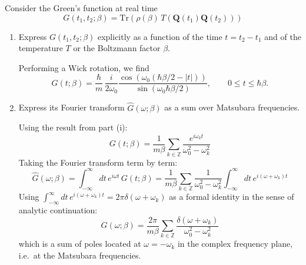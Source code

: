     
    Consider the Green's function at real time
    \begin{equation}
        G(t_1, t_2; \beta) = \mathrm{Tr}\!\left(\rho(\beta)\,T(\mathbf{Q}(t_1)\mathbf{Q}(t_2))\right)
    \end{equation}
    
    \begin{enumerate}[label=\alph*), resume]
    
        \item Express $G(t_1, t_2;\beta)$ explicitly as a function of the time $t = t_2 - t_1$ and of the temperature $T$ or the Boltzmann factor $\beta$.
        \begin{solution}
            Performing a Wick rotation, we find
            \begin{equation}
                G(t;\beta) = \frac{\hbar}{m}\,\frac{i}{2\omega_0}
            \frac{\cos\!\left(\omega_0(\hbar\beta/2 - |t|)\right)}{\sin\!\left(\omega_0\hbar\beta/2\right)},
            \qquad 0 \leq t \leq \hbar\beta.
            \end{equation}
        \end{solution}
    
        \item Express its Fourier transform $\hat{G}(\omega;\beta)$ as a sum over Matsubara frequencies.
        \begin{solution}
    Using the result from part (i):
    \begin{equation}
        G(t;\beta) = \frac{1}{m\beta}\sum_{k\in\mathbb{Z}}
        \frac{e^{i\omega_k t}}{\omega_0^2-\omega_k^2}
    \end{equation}
    Taking the Fourier transform term by term:
    \begin{equation}
        \hat{G}(\omega;\beta) = \int_{-\infty}^{\infty} dt\, e^{i\omega t}\, G(t;\beta)
        = \frac{1}{m\beta}\sum_{k\in\mathbb{Z}}\frac{1}{\omega_0^2-\omega_k^2}
        \int_{-\infty}^{\infty} dt\, e^{i(\omega+\omega_k)t}
    \end{equation}
    Using $\int_{-\infty}^{\infty} dt\, e^{i(\omega+\omega_k)t} = 2\pi\delta(\omega+\omega_k)$
    as a formal identity in the sense of analytic continuation:
    \begin{equation}
        \hat{G}(\omega;\beta) = \frac{2\pi}{m\beta}
        \sum_{k\in\mathbb{Z}}\frac{\delta(\omega+\omega_k)}{\omega_0^2-\omega_k^2}
    \end{equation}
    which is a sum of poles located at $\omega = -\omega_k$ in the complex 
    frequency plane, i.e.\ at the Matsubara frequencies.
\end{solution}
        
    
    \end{enumerate}
    
    